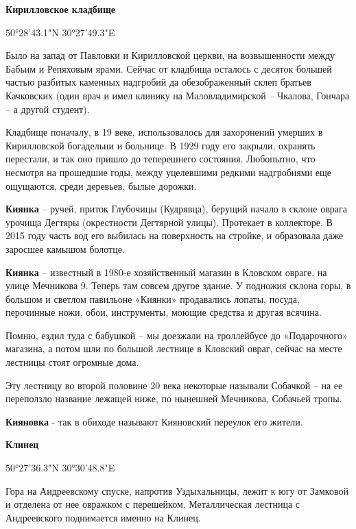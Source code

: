 \medskip

\textbf{Кирилловское кладбище} 

50°28'43.1"N 30°27'49.3"E

Было на запад от Павловки и Кирилловской церкви, на возвышенности между Бабьим и Репяховым ярами. Сейчас от кладбища осталось с десяток большей частью разбитых каменных надгробий да обезображенный склеп братьев Качковских (один врач и имел клинику на Маловладимирской – Чкалова, Гончара – а другой студент).

Кладбище поначалу, в 19 веке, использовалось для захоронений умерших в Кирилловской богадельни и больнице. В 1929 году его закрыли, охранять перестали, и так оно пришло до теперешнего состояния. Любопытно, что несмотря на прошедшие годы, между уцелевшими редкими надгробиями еще ощущаются, среди деревьев, былые дорожки.\\


\medskip


\textbf{Киянка} – ручей, приток Глубочицы (Кудрявца), берущий начало в склоне оврага урочища Дегтяры (окрестности Дегтярной улицы). Протекает в коллекторе. В 2015 году часть вод его выбилась на поверхность на стройке, и образовала даже заросшее камышом болотце.\\


\medskip


\textbf{Киянка} – известный в 1980-е хозяйственный магазин в Кловском овраге, на улице Мечникова 9. Теперь там совсем другое здание. У подножия склона горы, в большом и светлом павильоне «Киянки» продавались лопаты, посуда, перочинные ножи, обои, инструменты, моющие средства и другая всячина.

Помню, ездил туда с бабушкой – мы доезжали на троллейбусе до «Подарочного» магазина, а потом шли по большой лестнице в Кловский овраг, сейчас на месте лестницы стоят огромные дома.

Эту лестницу во второй половине 20 века некоторые называли Собачкой – на ее переползло название лежащей ниже, по нынешней Мечникова, Собачьей тропы.\\


\medskip

\textbf{Кияновка} - так в обиходе называют Кияновский переулок его жители.\\

\medskip

\textbf{Клинец}

50°27'36.3"N 30°30'48.8"E

Гора на Андреевскому спуске, напротив Уздыхальницы, лежит к югу от Замковой и отделена от нее овражком с перешейком. Металлическая лестница с Андреевского поднимается именно на Клинец. 

